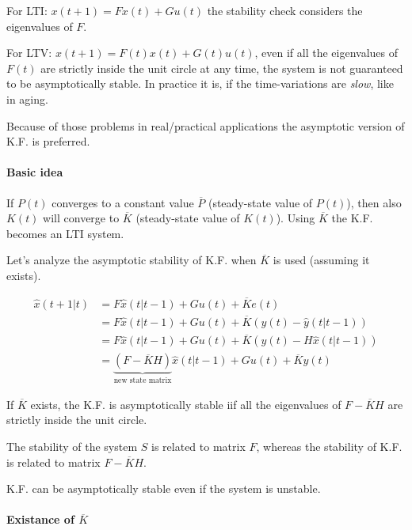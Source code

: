 \begin{remark}
    For LTI: $x(t+1) = Fx(t) + Gu(t)$ the stability check considers the eigenvalues of $F$.

    For LTV: $x(t+1) = F(t)x(t) + G(t)u(t)$, even if all the eigenvalues of $F(t)$ are strictly inside the unit circle at any time, the system is not guaranteed to be asymptotically stable.
    In practice it is, if the time-variations are \emph{slow}, like in aging.
\end{remark}

Because of those problems in real/practical applications the asymptotic version of K.F. is preferred.

\paragraph{Basic idea}
If $P(t)$ converges to a constant value $\overline{P}$ (steady-state value of $P(t)$), then also $K(t)$ will converge to $\overline{K}$ (steady-state value of $K(t)$).
Using $\overline{K}$ the K.F. becomes an LTI system.

Let's analyze the asymptotic stability of K.F. when $\overline{K}$ is used (assuming it exists).

\begin{align*}
    \hat{x}(t+1|t) &= F\hat{x}(t|t-1) + Gu(t) + \overline{K}e(t) \\
    &= F\hat{x}(t|t-1) + Gu(t) + \overline{K}(y(t) - \hat{y}(t|t-1)) \\
    &= F\hat{x}(t|t-1) + Gu(t) + \overline{K}(y(t) - H\hat{x}(t|t-1)) \\
    &= \underbrace{(F - \overline{K}H)}_{\text{new state matrix}} \hat{x}(t|t-1) + Gu(t) + \overline{K}y(t)
\end{align*}


If $\overline{K}$ exists, the K.F. is asymptotically stable iif all the eigenvalues of $F-\overline{K}H$ are strictly inside the unit circle.

\begin{remark}
    The stability of the system $S$ is related to matrix $F$, whereas the stability of K.F. is related to matrix $F-\overline{K}H$.

    K.F. can be asymptotically stable even if the system is unstable.
\end{remark}

\paragraph{Existance of $\overline{K}$}

